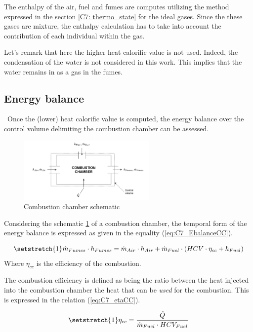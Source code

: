The enthalpy of the air, fuel and fumes are computes utilizing the method expressed in the section \ref{C7: thermo_state} for the ideal gases. Since the these gases are mixture, the enthalpy calculation has to take into account the contribution of each individual within the gas.

Let's remark that here the higher heat calorific value is not used. Indeed, the condensation of the water is not considered in this work. This implies that the water remains in as a gas in the fumes.

\subsection{Energy balance}
\quad\ Once the (lower) heat calorific value is computed, the energy balance over the control volume delimiting the combustion chamber can be assessed.

\begin{figure}[h]
    \centering
    \includegraphics[width=0.6\textwidth]{Chapitre_7/Images/CC.png}
    \caption{Combustion chamber schematic}
    \label{fig:C7_CC}
\end{figure}

 Considering the schematic \ref{fig:C7_CC} of a combustion chamber, the temporal form of the energy balance is expressed as given in the equality (\ref{eq:C7_EbalanceCC}).
 
\begin{equation}
    \setstretch{1}
    \dot{m}_{Fumes}\cdot h_{Fumes} =  \dot{m}_{Air}\cdot h_{Air} + \dot{m}_{Fuel}\cdot\left(HCV\cdot \eta_{cc} + h_{Fuel}\right)\label{eq:C7_EbalanceCC}
\end{equation}
Where $\eta_{cc}$ is the efficiency of the combustion. 

The combustion efficiency is defined as being the ratio between the heat injected into the combustion chamber the heat that can be \textit{used} for the combustion. This is expressed in the relation (\ref{eq:C7_etaCC}).

\begin{equation}
    \setstretch{1}
    \eta_{cc} = \frac{\dot{Q}}{\dot{m}_{Fuel}\cdot HCV_{Fuel}}\label{eq:C7_etaCC}
\end{equation}